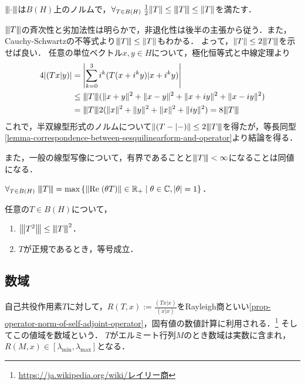 \documentclass[uplatex,dvipdfmx]{jsreport}
\begin{document}
\begin{proposition}[数域半径は同値なノルムを定める]
    $\nnorm{\cdot}$は$B(H)$上のノルムで，$\forall_{T\in B(H)}\;\frac{1}{2}\norm{T}\le\nnorm{T}\le\norm{T}$を満たす．
\end{proposition}
\begin{Proof}
    $\nnorm{T}$の斉次性と劣加法性は明らかで，非退化性は後半の主張から従う．また，Cauchy-Schwartzの不等式より$\nnorm{T}\le\norm{T}$もわかる．
    よって，$\norm{T}\le 2\nnorm{T}$を示せば良い．
    任意の単位ベクトル$x,y\in H$について，極化恒等式と中線定理より
    \begin{align*}
        4\abs{(Tx|y)}&=\Abs{\sum^3_{k=0}i^k(T(x+i^ky)|x+i^ky)}\\
        &\le\nnorm{T}(\norm{x+y}^2+\norm{x-y}^2+\norm{x+iy}^2+\norm{x-iy}^2)\\
        &=\nnorm{T}2(\norm{x}^2+\norm{y}^2+\norm{x}^2+\norm{iy}^2)=8\nnorm{T}
    \end{align*}
    これで，半双線型形式のノルムについて$\norm{(T-|-)}\le2\nnorm{T}$を得たが，等長同型\ref{lemma-correspondence-between-sesquilinearform-and-operator}より結論を得る．
\end{Proof}
\begin{remarks}
    また，一般の線型写像について，有界であることと$\nnorm{T}<\infty$になることは同値になる．
\end{remarks}

\begin{proposition}
    $\forall_{T\in B(H)}\;\nnorm{T}=\max\Brace{\norm{\Re(\theta T)}\in\R_+\mid\theta\in\C,\abs{\theta}=1}$．
\end{proposition}

\begin{proposition}
    任意の$T\in B(H)$について，
    \begin{enumerate}
        \item $\nnorm{T^2}\le\nnorm{T}^2$．
        \item $T$が正規であるとき，等号成立．
    \end{enumerate}
\end{proposition}

\subsection{数域}

\begin{tcolorbox}[colframe=ForestGreen, colback=ForestGreen!10!white,breakable,colbacktitle=ForestGreen!40!white,coltitle=black,fonttitle=\bfseries\sffamily,
title=]
    自己共役作用素$T$に対して，$R(T,x):=\frac{(Tx|x)}{(x|x)}$をRayleigh商といい\ref{prop-operator-norm-of-self-adjoint-operator}，固有値の数値計算に利用される．\footnote{\url{https://ja.wikipedia.org/wiki/レイリー商}}
    そしてこの値域を数域という．
    $T$がエルミート行列$M$のとき数域は実数に含まれ，$R(M,x)\in[\lambda_\mathrm{min},\lambda_\mathrm{max}]$となる．
\end{tcolorbox}
\end{document}
